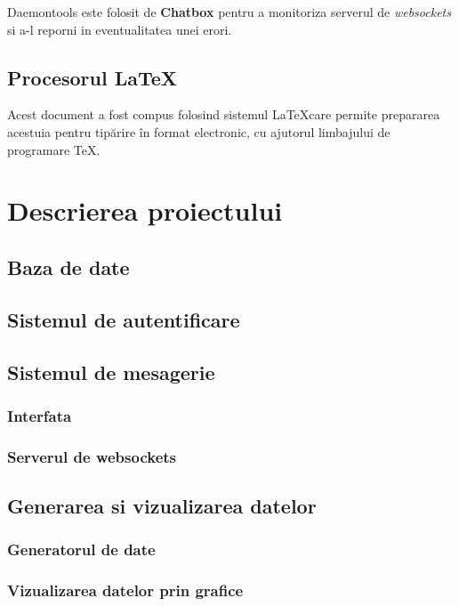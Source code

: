 \documentclass[12pt,a4paper]{article}
\begin{document}
Daemontools este folosit de \textbf{Chatbox} pentru a monitoriza serverul 
de \textit{websockets} si a-l reporni in eventualitatea unei erori.

\subsection{Procesorul \LaTeX}
Acest document a fost compus folosind sistemul \LaTeX  care permite prepararea
acestuia pentru tipărire în format electronic,
cu ajutorul limbajului de programare \TeX.

\newpage
\section{Descrierea proiectului}

\subsection{Baza de date}

\subsection{Sistemul de autentificare}

\subsection{Sistemul de mesagerie}

\subsubsection{Interfata}

\subsubsection{Serverul de websockets}

\subsection{Generarea si vizualizarea datelor}

\subsubsection{Generatorul de date}

\subsubsection{Vizualizarea datelor prin grafice}
\end{document}
